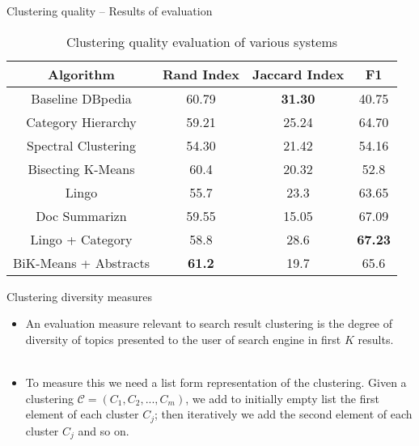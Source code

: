 \documentclass{beamer}
\begin{document}
\begin{frame}{Clustering quality -- Results of evaluation}
\begin{table}[h]
\centering
\begin{tabular} {|c | c | c | c|}
  \hline
  Algorithm & Rand Index & Jaccard Index  & F1 \\
  \hline
  Baseline DBpedia & 60.79 & {\bf 31.30} & 40.75 \\
  Category Hierarchy & 59.21 & 25.24 & 64.70 \\
  Spectral Clustering & 54.30 & 21.42 & 54.16 \\
  \hline
  Bisecting K-Means & 60.4 & 20.32 & 52.8 \\
  Lingo & 55.7 & 23.3 & 63.65 \\
  Doc Summarizn & 59.55 & 15.05 & 67.09 \\
  \hline
  Lingo + Category & 58.8 & 28.6 & {\bf 67.23} \\
  BiK-Means + Abstracts & {\bf 61.2} & 19.7 & 65.6 \\
  \hline
\end{tabular}
\caption{Clustering quality evaluation of various systems}
\end{table}
\end{frame}

\begin{frame}{Clustering diversity measures}
\begin{itemize}
\item An evaluation measure relevant to search result clustering is
  the degree of diversity of topics presented to the user of search
  engine in first $K$ results. \\~\\
\item To measure this we need a list form representation of the
  clustering. Given a clustering $\mathcal{C} = (C_1,C_2,...,C_m)$, we
  add to initially empty list the first element of each cluster $C_j$;
  then iteratively we add the second element of each cluster $C_j$ and
  so on. 
\end{itemize}
\end{frame}
\end{document}
